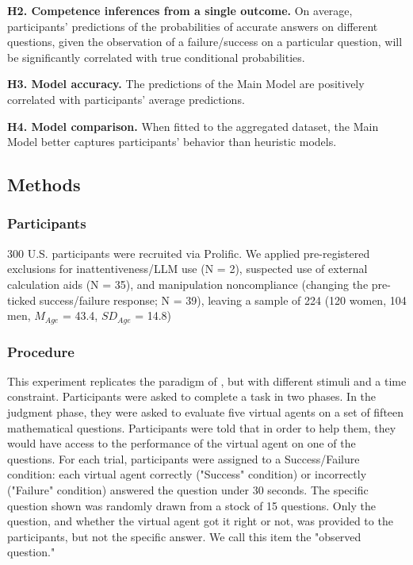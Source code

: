 \documentclass[10pt,letterpaper]{article}
\begin{document}
\textbf{H2. Competence inferences from a single outcome.} On average, participants' predictions of the probabilities of accurate answers on different questions, given the observation of a failure/success on a particular question, will be significantly correlated with true conditional probabilities.

\textbf{H3. Model accuracy.} The predictions of the Main Model are positively correlated with participants' average predictions.

\textbf{H4. Model comparison.} When fitted to the aggregated dataset, the Main Model better captures participants' behavior than heuristic models.

\subsection{Methods}\label{methods}

\subsubsection{Participants}\label{participants-1}

300 U.S. participants were recruited via Prolific. We applied pre-registered exclusions for inattentiveness/LLM use (N = 2), suspected use of external calculation aids (N = 35), and manipulation noncompliance (changing the pre-ticked success/failure response; N = 39), leaving a sample of 224 (120 women, 104 men, \(M_{Age}\) = 43.4, \(SD_{Age}\) = 14.8)

\subsubsection{Procedure}\label{behavioral-task}

This experiment replicates the paradigm of \citet{Mercier-2026}, but with different stimuli and a time constraint. Participants were asked to complete a task in two phases. In the judgment phase, they were asked to evaluate five virtual agents on a set of fifteen mathematical questions. Participants were told that in order to help them, they would have access to the performance of the virtual agent on one of the questions. For each trial, participants were assigned to a Success/Failure condition: each virtual agent correctly ("Success" condition) or incorrectly ("Failure" condition) answered the question under 30 seconds. The specific question shown was randomly drawn from a stock of 15 questions. Only the question, and whether the virtual agent got it right or not, was provided to the participants, but not the specific answer. We call this item the "observed question." 
\end{document}
